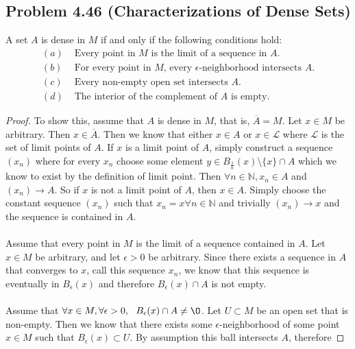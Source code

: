 \documentclass{article}
\begin{document}
\subsection*{Problem 4.46 (Characterizations of Dense Sets)}
    A set $A$ is dense in $M$ if and only if the following conditions hold:
    \begin{align*} 
        (a) & \text{ Every point in $M$ is the limit of a sequence in $A$.}\\
        (b) & \text{ For every point in $M$, every $\epsilon$-neighborhood intersects $A$.}\\
        (c) & \text{ Every non-empty open set intersects $A$. }\\
        (d) & \text{ The interior of the complement of $A$ is empty. }
    \end{align*}
    \begin{proof}
         To show this, assume that $A$ is dense in $M$, that is, $\overline{A} = M$. Let $x \in M$ be arbitrary.
        Then $x \in \overline{A}$. Then we know that either $x \in A$ or $x \in \mathcal{L}$ where $\mathcal{L}$ is the set of limit points of $A$.
        If $x$ is a limit point of $A$, simply construct a sequence $(x_n)$ where for every $x_n$ choose some element $y \in B_{\frac{1}{n}}(x) \setminus \{x\} \cap A$
        which we know to exist by the definition of limit point. Then $\forall n \in \mathbb{N}, x_n \in A$ and $(x_n) \rightarrow A$. So if $x$ is not a 
        limit point of $A$, then $x \in A$. Simply choose the constant sequence $(x_n)$ such that $x_n = x \forall n \in \mathbb{N}$ and trivially $(x_n) \rightarrow x$
        and the sequence is contained in $A$.\\\\
         Assume that every point in $M$ is the limit of a sequence contained in $A$.
        Let $x \in M$ be arbitrary, and let $\epsilon > 0$ be arbitrary. Since there exists a sequence in $A$
        that converges to $x$, call this sequence $x_n$, we know that this sequence is eventually in $B_\epsilon(x)$
        and therefore $B_\epsilon(x) \cap A$ is not empty.\\\\
         Assume that $\forall x \in M, \forall \epsilon > 0,\ \ B_\epsilon(x) \cap A \neq \O$.
        Let $U \subset M$ be an open set that is non-empty. Then we know that there exists some $\epsilon$-neighborhood of
        some point $x \in M$ such that $B_\epsilon(x) \subset U$. By assumption this ball intersects $A$, therefore

\end{proof}
\end{document}
